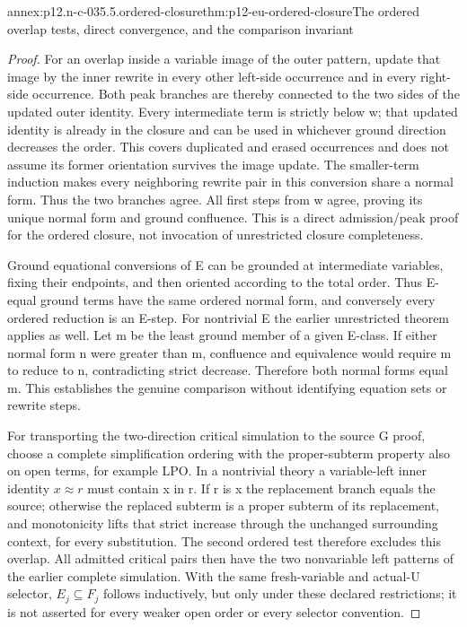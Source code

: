 \begin{annexitem}{annex:p12.n-c-035.5.ordered-closure}{thm:p12-eu-ordered-closure}{The ordered overlap tests, direct convergence, and the comparison invariant}
\begin{proof}
For an overlap inside a variable image of the outer pattern, update
that image by the inner rewrite in every other left-side occurrence
and in every right-side occurrence. Both peak branches are thereby
connected to the two sides of the updated outer identity. Every
intermediate term is strictly below w; that updated identity is
already in the closure and can be used in whichever ground direction
decreases the order. This covers duplicated and erased occurrences
and does not assume its former orientation survives the image update.
The smaller-term induction makes every neighboring rewrite pair in
this conversion share a normal form. Thus the two branches agree.
All first steps from w agree, proving its unique normal form and
ground confluence. This is a direct admission/peak proof for the
ordered closure, not invocation of unrestricted closure completeness.

Ground equational conversions of E can be grounded at intermediate
variables, fixing their endpoints, and then oriented according to
the total order. Thus E-equal ground terms have the same ordered
normal form, and conversely every ordered reduction is an E-step.
For nontrivial E the earlier unrestricted theorem applies as well.
Let m be the least ground member of a given E-class. If either
normal form n were greater than m, confluence and equivalence would
require m to reduce to n, contradicting strict decrease. Therefore
both normal forms equal m. This establishes the genuine comparison
without identifying equation sets or rewrite steps.

For transporting the two-direction critical simulation to the
source G proof, choose a complete simplification ordering with the
proper-subterm property also on open terms, for example LPO.
In a nontrivial theory a variable-left inner identity \(x\approx r\)
must contain x in r. If r is x the replacement branch equals the
source; otherwise the replaced subterm is a proper subterm of its
replacement, and monotonicity lifts that strict increase through
the unchanged surrounding context, for every substitution. The second ordered
test therefore excludes this overlap. All admitted critical pairs
then have the two nonvariable left patterns of the earlier complete
simulation. With the same fresh-variable and actual-U selector,
\(E_j\subseteq F_j\) follows inductively, but only under these
declared restrictions; it is not asserted for every weaker open
order or every selector convention.


\end{proof}
\end{annexitem}
